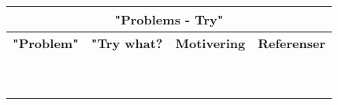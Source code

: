 \documentclass[conference]{IEEEtran}
\begin{document}
\begin{table}[htbp]
\begin{center}
\begin{tabular}{|c|c|c|c|}
\hline
\multicolumn{4}{|c|}{\cellcolor{grey}\textbf{"Problems - Try"}}\\
\hline \rowcolor{grey}
\textbf{"Problem"}                      & \textbf{"Try what?}      & \textbf{Motivering} & \textbf{Referenser} \\
\hline
                                        &                          &                     & \\
                                        &                          &                     & \\
\hline
                                        &                          &                     & \\
                                        &                          &                     & \\
\hline
                                        &                          &                     & \\
\hline
                                        &                          &                     & \\
\hline
                                        &                          &                     & \\
\hline
                                        &                          &                     & \\
\hline

\multicolumn{4}{c}{}\\


\end{tabular}
\end{center}
\end{table}
\end{document}
